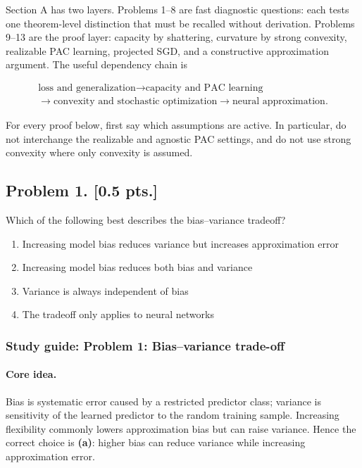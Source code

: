 \documentclass[11pt,a4paper]{article}
\begin{document}
Section A has two layers. Problems 1--8 are fast diagnostic questions: each tests one theorem-level distinction that must be recalled without derivation. Problems 9--13 are the proof layer: capacity by shattering, curvature by strong convexity, realizable PAC learning, projected SGD, and a constructive approximation argument. The useful dependency chain is

\[
\begin{gathered}
\text{loss and generalization}
\longrightarrow
\text{capacity and PAC learning} \\
\longrightarrow
\text{convexity and stochastic optimization}
\longrightarrow
\text{neural approximation}.
\end{gathered}
\]

For every proof below, first say which assumptions are active. In particular, do not interchange the realizable and agnostic PAC settings, and do not use strong convexity where only convexity is assumed.



\subsection{Problem 1. [0.5 pts.]}
Which of the following best describes the bias--variance tradeoff?
\begin{enumerate}[label=(\alph*)]
    \item Increasing model bias reduces variance but increases approximation error
    \item Increasing model bias reduces both bias and variance
    \item Variance is always independent of bias
    \item The tradeoff only applies to neural networks
\end{enumerate}


\subsubsection{Study guide: Problem 1: Bias--variance trade-off}

\paragraph{Core idea.}

Bias is systematic error caused by a restricted predictor class; variance is sensitivity of the learned predictor to the random training sample. Increasing flexibility commonly lowers approximation bias but can raise variance. Hence the correct choice is \textbf{(a)}: higher bias can reduce variance while increasing approximation error.
\end{document}
